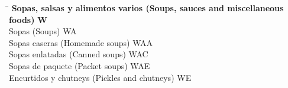 \begin{small}
    \begin{tabbing}
    \hspace{15cm} \= \hspace{0cm} \kill
        \textbf{Sopas, salsas y alimentos varios (Soups, sauces and miscellaneous foods)} \> \textbf{W} \\
            \hspace{0.5cm}Sopas (Soups) \> WA \\
                \hspace{1cm}Sopas caseras (Homemade soups) \> WAA \\
                \hspace{1cm}Sopas enlatadas (Canned soups) \> WAC \\
                \hspace{1cm}Sopas de paquete (Packet soups) \> WAE \\
            \hspace{0.5cm}Encurtidos y chutneys (Pickles and chutneys) \> WE \\
    \end{tabbing}
\end{small}